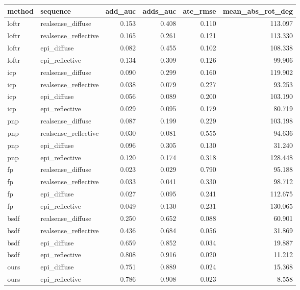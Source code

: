 \begin{tabular}{llrrrr}
\toprule
method & sequence & add_auc & adds_auc & ate_rmse & mean_abs_rot_deg \\
\midrule
loftr & realsense_diffuse & 0.153 & 0.408 & 0.110 & 113.097 \\
loftr & realsense_reflective & 0.165 & 0.261 & 0.121 & 113.330 \\
loftr & epi_diffuse & 0.082 & 0.455 & 0.102 & 108.338 \\
loftr & epi_reflective & 0.134 & 0.309 & 0.126 & 99.906 \\
icp & realsense_diffuse & 0.090 & 0.299 & 0.160 & 119.902 \\
icp & realsense_reflective & 0.038 & 0.079 & 0.227 & 93.253 \\
icp & epi_diffuse & 0.056 & 0.089 & 0.200 & 103.190 \\
icp & epi_reflective & 0.029 & 0.095 & 0.179 & 80.719 \\
pnp & realsense_diffuse & 0.087 & 0.199 & 0.229 & 103.198 \\
pnp & realsense_reflective & 0.030 & 0.081 & 0.555 & 94.636 \\
pnp & epi_diffuse & 0.096 & 0.305 & 0.130 & 31.240 \\
pnp & epi_reflective & 0.120 & 0.174 & 0.318 & 128.448 \\
fp & realsense_diffuse & 0.023 & 0.029 & 0.790 & 95.188 \\
fp & realsense_reflective & 0.033 & 0.041 & 0.330 & 98.712 \\
fp & epi_diffuse & 0.027 & 0.095 & 0.241 & 112.675 \\
fp & epi_reflective & 0.049 & 0.130 & 0.231 & 130.065 \\
bsdf & realsense_diffuse & 0.250 & 0.652 & 0.088 & 60.901 \\
bsdf & realsense_reflective & 0.436 & 0.684 & 0.056 & 31.869 \\
bsdf & epi_diffuse & 0.659 & 0.852 & 0.034 & 19.887 \\
bsdf & epi_reflective & 0.808 & 0.916 & 0.020 & 11.212 \\
ours & epi_diffuse & 0.751 & 0.889 & 0.024 & 15.368 \\
ours & epi_reflective & 0.786 & 0.908 & 0.023 & 8.558 \\
\bottomrule
\end{tabular}
